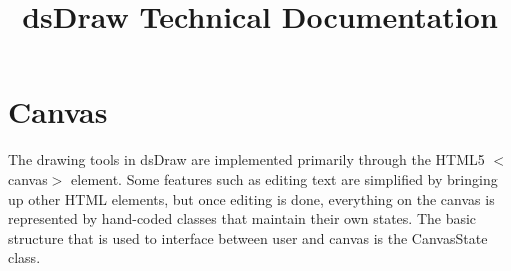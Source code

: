 \documentclass{article}
\title{\vspace{-4em}\textbf{dsDraw Technical Documentation}}
\date{}
\begin{document}
\maketitle

\section*{Canvas}

The drawing tools in dsDraw are implemented primarily through the HTML5 $<$canvas$>$
element. Some features such as editing text are simplified by bringing up other
HTML elements, but once editing is done, everything on the canvas is represented
by hand-coded classes that maintain their own states. The basic structure that
is used to interface between user and canvas is the CanvasState class. 
\end{document}
